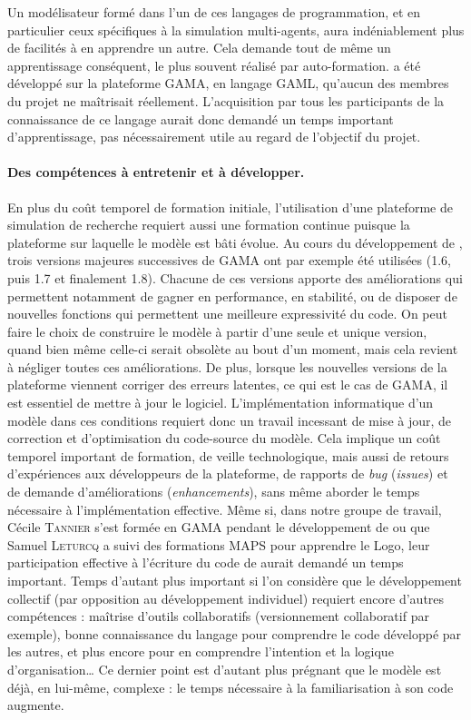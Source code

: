 Un modélisateur formé dans l'un de ces langages de programmation, et en particulier ceux spécifiques à la simulation multi-agents, aura indéniablement plus de facilités à en apprendre un autre.
Cela demande tout de même un apprentissage conséquent, le plus souvent réalisé par auto-formation.
\simfeodal{} a été développé sur la plateforme GAMA, en langage GAML, qu'aucun des membres du projet ne maîtrisait réellement.
L'acquisition par tous les participants de la connaissance de ce langage aurait donc demandé un temps important d'apprentissage, pas nécessairement utile au regard de l'objectif du projet.

\paragraph{Des compétences à entretenir et à développer.}
En plus du coût temporel de formation initiale, l'utilisation d'une plateforme de simulation \og de recherche\fg{} requiert aussi une formation continue puisque la plateforme sur laquelle le modèle est bâti évolue.
Au cours du développement de \simfeodal{}, trois versions \og majeures\fg{} successives de GAMA ont par exemple été utilisées (1.6, puis 1.7 et finalement 1.8).
Chacune de ces versions apporte des améliorations qui permettent notamment de gagner en performance, en stabilité, ou de disposer de nouvelles fonctions qui permettent une meilleure expressivité du code.
On peut faire le choix de construire le modèle à partir d'une seule et unique version, quand bien même celle-ci serait obsolète au bout d'un moment, mais cela revient à négliger toutes ces améliorations.
De plus, lorsque les nouvelles versions de la plateforme viennent corriger des erreurs latentes, ce qui est le cas de GAMA, il est essentiel de mettre à jour le logiciel.
L'implémentation informatique d'un modèle dans ces conditions requiert donc un travail incessant de mise à jour, de correction et d'optimisation du code-source du modèle.
Cela implique un coût temporel important de formation, de veille technologique, mais aussi de retours d'expériences aux développeurs de la plateforme, de rapports de \textit{bug} (\textit{issues}) et de demande d'améliorations (\textit{enhancements}), sans même aborder le temps nécessaire à l'implémentation effective.
Même si, dans notre groupe de travail, Cécile \textsc{Tannier} s'est formée en GAMA pendant le développement de \simfeodal{} ou que Samuel \textsc{Leturcq} a suivi des formations MAPS pour apprendre le Logo, leur participation effective à l'écriture du code de \simfeodal{} aurait demandé un temps important.
Temps d'autant plus important si l'on considère que le développement collectif (par opposition au développement individuel) requiert encore d'autres compétences :
	maîtrise d'outils collaboratifs (versionnement collaboratif par exemple), bonne connaissance du langage pour comprendre le code développé par les autres, et plus encore pour en comprendre l'intention et la logique d'organisation\ldots
Ce dernier point est d'autant plus prégnant que le modèle est déjà, en lui-même, complexe :
	le temps nécessaire à la familiarisation à son code augmente.

